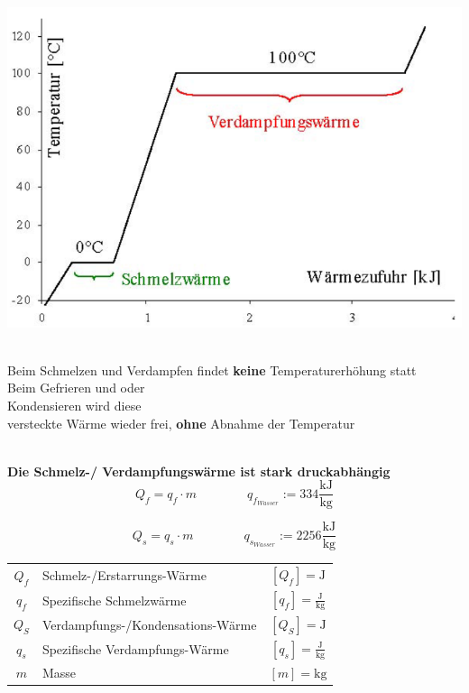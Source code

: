 \begin{minipage}{0.5\linewidth}
\includegraphics[width=0.99\linewidth]{Bilder/latente_waerme_2}\\
\\
\end{minipage}
\hfill
\begin{minipage}{0.5\linewidth}
Beim Schmelzen und Verdampfen findet \textbf{keine} Temperaturerhöhung statt \\
Beim Gefrieren und oder \\
Kondensieren wird diese \\
versteckte Wärme wieder frei, \textbf{ohne} Abnahme der Temperatur \\
\\
\end{minipage}

\textbf{Die Schmelz-/ Verdampfungswärme ist stark druckabhängig} \\


$$ \boxed{ Q_f = q_f \cdot m } \qquad \qquad q_{f_{Wasser}} := 334 \mathrm{\frac{kJ}{kg}} $$

$$ \boxed{ Q_s = q_s \cdot m } \qquad \qquad q_{s_{Wasser}} := 2256 \mathrm{\frac{kJ}{kg} } $$



\begin{tabular}{c l c}

	$Q_f$ & Schmelz-/Erstarrungs-Wärme & $[Q_f] = \mathrm{J}$ \\
	\rule{0pt}{8pt}$q_f$ & Spezifische Schmelzwärme & $[q_f] = \mathrm{\frac{J}{kg}}$ \\
	$Q_S$ & Verdampfungs-/Kondensations-Wärme & $[Q_S] = \mathrm{J}$ \\
	\rule{0pt}{8pt}$q_s$ & Spezifische Verdampfungs-Wärme& $[q_s] = \mathrm{\frac{J}{kg}}$ \\
	$m$ & Masse & $[m] = \mathrm{kg}$ \\
\end{tabular}




